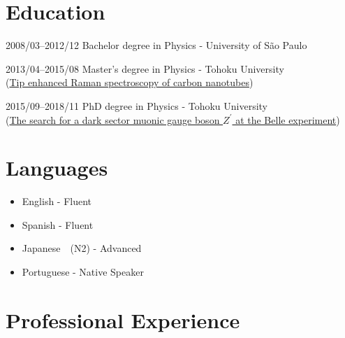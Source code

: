 \documentclass[a4paper]{article}
\begin{document}
\section{Education}
\begin{CV}
\item[2008/03--2012/12] Bachelor degree in Physics - University of São Paulo
\item[2013/04--2015/08] Master's degree in Physics - Tohoku University \\
  \hspace*{-2cm}
  (\href{https://flex.phys.tohoku.ac.jp/japanese/riron/ronbun/m15thom.pdf}{Tip enhanced Raman spectroscopy of carbon nanotubes})
\item[2015/09--2018/11] PhD degree in Physics - Tohoku University \\
  \hspace*{-3cm} (\href{http://hdl.handle.net/10097/00125071}{The search for a dark sector muonic gauge boson $Z^'$ at the Belle experiment})
\end{CV}



\section{Languages}
\begin{itemize}
	\item English - Fluent
	\item Spanish - Fluent
  \item Japanese　(N2) - Advanced
  \item Portuguese - Native Speaker
\end{itemize}


\section{Professional Experience}
\end{document}
